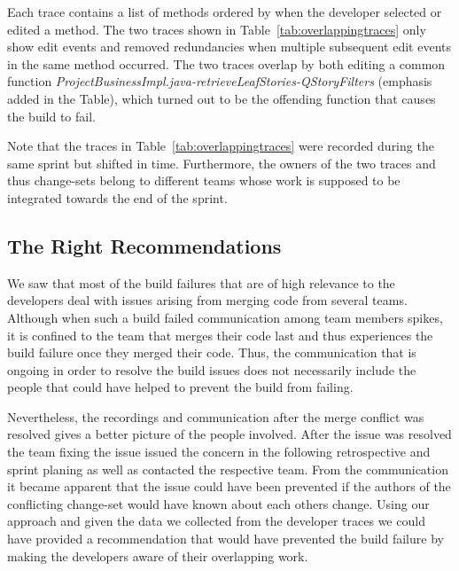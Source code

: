 Each trace contains a list of methods ordered by when the developer selected or edited a method.
The two traces shown in Table~\ref{tab:overlappingtraces} only show edit events and removed redundancies when multiple subsequent edit events in the same method occurred.
The two traces overlap by both editing a common function \emph{ProjectBusinessImpl.java-retrieveLeafStories-QStoryFilters} (emphasis added in the Table), which turned out to be the offending function that causes the build to fail.

Note that the traces in Table~\ref{tab:overlappingtraces} were recorded during the same sprint but shifted in time.
Furthermore, the owners of the two traces and thus change-sets belong to different teams whose work is supposed to be integrated towards the end of the sprint.

\subsection{The Right Recommendations}
We saw that most of the build failures that are of high relevance to the developers deal with issues arising from merging code from several teams.
Although when such a build failed communication among team members spikes, it is confined to the team that merges their code last and thus experiences the build failure once they merged their code.
Thus, the communication that is ongoing in order to resolve the build issues does not necessarily include the people that could have helped to prevent the build from failing.

Nevertheless, the recordings and communication after the merge conflict was resolved gives a better picture of the people involved.
After the issue was resolved the team fixing the issue issued the concern in the following retrospective and sprint planing as well as contacted the respective team.
From the communication it became apparent that the issue could have been prevented if the authors of the conflicting change-set would have known about each others change.
Using our approach and given the data we collected from the developer traces we could have provided a recommendation that would have prevented the build failure by making the developers aware of their overlapping work.

